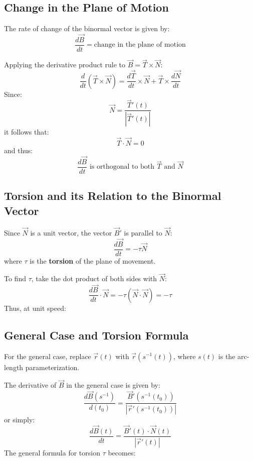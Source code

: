 \documentclass{report}
\begin{document}
\subsection{Change in the Plane of Motion}

The rate of change of the binormal vector is given by:
\[
	\frac{d\vec{B}}{dt} = \text{change in the plane of motion}
\]

Applying the derivative product rule to $\vec{B} = \vec{T} \times \vec{N}$:
\[
	\frac{d}{dt} (\vec{T} \times \vec{N}) = \frac{d\vec{T}}{dt} \times \vec{N} + \vec{T} \times \frac{d\vec{N}}{dt}
\]
Since:
\[
	\vec{N} = \frac{\vec{T}'(t)}{|\vec{T}'(t)|}
\]
it follows that:
\[
	\vec{T} \cdot \vec{N} = 0
\]
and thus:
\[
	\frac{d\vec{B}}{dt} \text{ is orthogonal to both } \vec{T} \text{ and } \vec{N}
\]

\subsection{Torsion and its Relation to the Binormal Vector}

Since $\vec{N}$ is a unit vector, the vector $\vec{B}'$ is parallel to $\vec{N}$:
\[
	\frac{d\vec{B}}{dt} = -\tau \vec{N}
\]
where $\tau$ is the \textbf{torsion} of the plane of movement.


To find $\tau$, take the dot product of both sides with $\vec{N}$:
\[
	\frac{d\vec{B}}{dt} \cdot \vec{N} = -\tau (\vec{N} \cdot \vec{N}) = -\tau
\]
Thus, at unit speed:

\subsection{General Case and Torsion Formula}

For the general case, replace $\vec{r}(t)$ with $\vec{r}(s^{-1}(t))$, where $s(t)$ is the arc-length parameterization.

The derivative of $\vec{B}$ in the general case is given by:
\[
	\frac{d\vec{B}(s^{-1})}{d(t_0)} = \frac{\vec{B}'(s^{-1}(t_0))}{|\vec{r}'(s^{-1}(t_0))|}
\]
or simply:
\[
	\frac{d\vec{B}(t)}{dt} = \frac{\vec{B}'(t) \cdot \vec{N}(t)}{|\vec{r}'(t)|}
\]
The general formula for torsion $\tau$ becomes:

\end{document}
